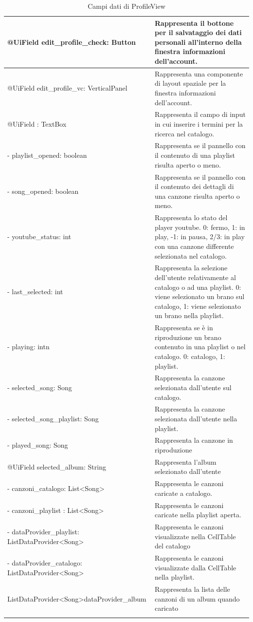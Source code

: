 \begin{longtable}{|p{}|p{}|}
@UiField edit\_profile\_check: Button & Rappresenta il bottone per il
salvataggio dei dati personali all'interno della finestra informazioni
dell'account.\\\hline
@UiField edit\_profile\_vc: VerticalPanel & Rappresenta una componente di layout
spaziale per la finestra informazioni dell'account.\\\hline
@UiField : TextBox & Rappresenta il campo di input in cui inserire i
termini per la ricerca nel catalogo.\\\hline
- playlist\_opened: boolean & Rappresenta se il pannello con il contenuto di una
playlist risulta aperto o meno. \\\hline
- song\_opened: boolean & Rappresenta se il pannello con il contenuto dei
dettagli di una canzone risulta aperto o meno. \\\hline
- youtube\_status: int & Rappresenta lo stato del player youtube. 0: fermo, 1:
in play, -1: in pausa, 2/3: in play con una canzone differente selezionata nel
catalogo. \\\hline
- last\_selected: int & Rappresenta la selezione dell'utente relativamente al
catalogo o ad una playlist. 0: viene selezionato un brano sul catalogo, 1: viene
selezionato un brano nella playlist. \\\hline
- playing: intn & Rappresenta se \`e in riproduzione un brano contenuto in una
playlist o nel catalogo. 0: catalogo, 1: playlist. \\\hline
- selected\_song: Song & Rappresenta la canzone selezionata dall'utente sul
catalogo. \\\hline
- selected\_song\_playlist: Song & Rappresenta la canzone selezionata
dall'utente nella playlist.\\\hline
- played\_song: Song & Rappresenta la canzone in riproduzione\\\hline
@UiField selected\_album: String &  Rappresenta l'album selezionato
dall'utente\\\hline
- canzoni\_catalogo: List\textless Song\textgreater & Rappresenta le
canzoni caricate a catalogo.\\\hline
- canzoni\_playlist : List\textless Song\textgreater & Rappresenta le
canzoni caricate nella playlist aperta.\\\hline - dataProvider\_playlist:
ListDataProvider\textless Song\textgreater & Rappresenta le canzoni
visualizzate nella CellTable del catalogo\\\hline - dataProvider\_catalogo:
ListDataProvider\textless Song\textgreater & Rappresenta le canzoni visualizzate
dalla CellTable nella playlist.\\\hline
ListDataProvider\textless Song\textgreater dataProvider\_album & Rappresenta la
lista delle canzoni di un album quando caricato\\\hline
\caption{Campi dati di ProfileView}
\end{longtable}
